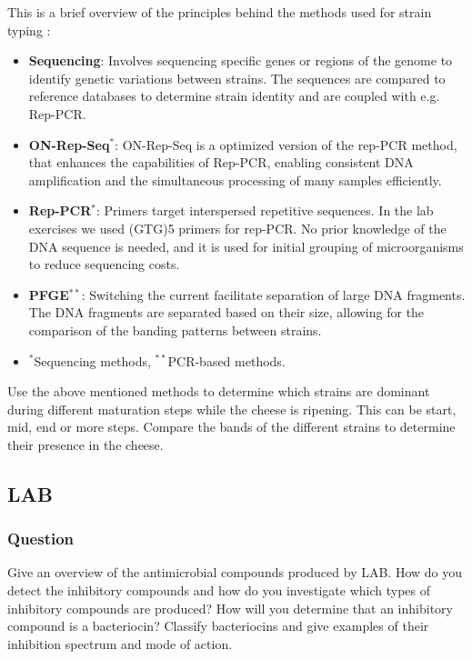 This is a brief overview of the principles behind the methods used for strain typing \cite*{LS09,L3-SeqBasedClass}:
\begin{itemize}
    \item \textbf{Sequencing}: Involves sequencing specific genes or regions of the genome to identify genetic variations between strains. The sequences are compared to reference databases to determine strain identity and are coupled with e.g. Rep-PCR.
    \item \textbf{ON-Rep-Seq$^*$}: ON-Rep-Seq is a optimized version of the rep-PCR method, that enhances the capabilities of Rep-PCR, enabling consistent DNA amplification and the simultaneous processing of many samples efficiently.
    \item \textbf{Rep-PCR$^*$}: Primers target interspersed repetitive sequences. In the lab exercises we used (GTG)5 primers for rep-PCR. No prior knowledge of the DNA sequence is needed, and it is used for initial grouping of microorganisms to reduce sequencing costs.
    \item \textbf{PFGE$^{**}$}: Switching the current facilitate separation of large DNA fragments. The DNA fragments are separated based on their size, allowing for the comparison of the banding patterns between strains.
    \item $^*$Sequencing methods, $^{**}$PCR-based methods.
\end{itemize}

\vspace{0.5em}
Use the above mentioned methods to determine which strains are dominant during different maturation steps while the cheese is ripening. This can be start, mid, end or more steps. Compare the bands of the different strains to determine their presence in the cheese.

\subsection{LAB}
\subsubsection*{Question}
Give an overview of the antimicrobial compounds produced by LAB. How do you detect the inhibitory compounds and how do you investigate which types of inhibitory compounds are produced? How will you determine that an inhibitory compound is a bacteriocin? Classify bacteriocins and give examples of their inhibition spectrum and mode of action. 

